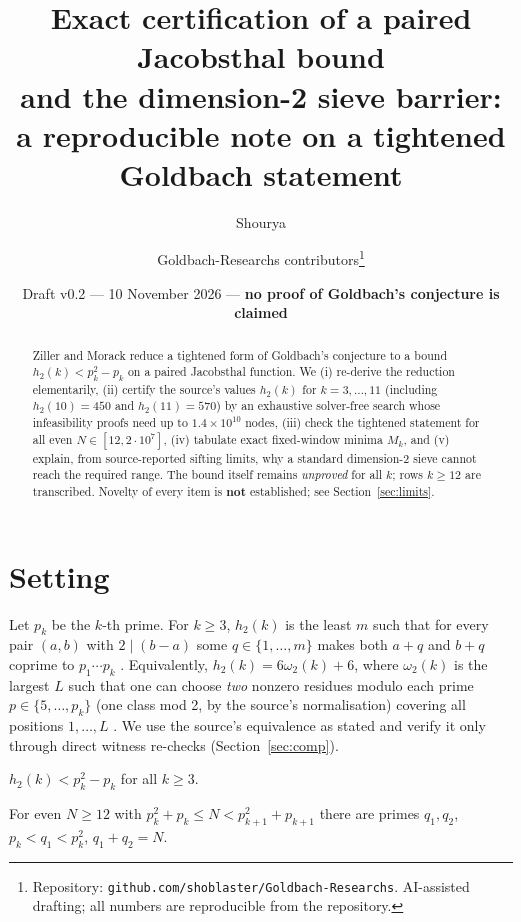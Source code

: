 \documentclass[11pt]{article}
\title{Exact certification of a paired Jacobsthal bound\\and the dimension-2 sieve barrier:\\a reproducible note on a tightened Goldbach statement}
\author{Shourya \and Goldbach-Researchs contributors\thanks{Repository: \texttt{github.com/shoblaster/Goldbach-Researchs}. AI-assisted drafting; all numbers are reproducible from the repository.}}
\date{Draft v0.2 --- 10 November 2026 --- \textbf{no proof of Goldbach's conjecture is claimed}}
\newcommand{\hh}{h_2}\newcommand{\wt}{\omega_2}
\begin{document}
\maketitle
\begin{abstract}
Ziller and Morack reduce a tightened form of Goldbach's conjecture to a bound $\hh(k)<p_k^2-p_k$ on a paired Jacobsthal function. We (i) re-derive the reduction elementarily, (ii) certify the source's values $\hh(k)$ for $k=3,\dots,11$ (including $\hh(10)=450$ and $\hh(11)=570$) by an exhaustive solver-free search whose infeasibility proofs need up to $1.4\times10^{10}$ nodes, (iii) check the tightened statement for all even $N\in[12,2\cdot10^{7}]$, (iv) tabulate exact fixed-window minima $M_k$, and (v) explain, from source-reported sifting limits, why a standard dimension-2 sieve cannot reach the required range. The bound itself remains \emph{unproved} for all $k$; rows $k\ge 12$ are transcribed. Novelty of every item is \textbf{not} established; see Section~\ref{sec:limits}.
\end{abstract}

\section{Setting}
Let $p_k$ be the $k$-th prime. For $k\ge3$, $\hh(k)$ is the least $m$ such that for every pair $(a,b)$ with $2\mid(b-a)$ some $q\in\{1,\dots,m\}$ makes both $a+q$ and $b+q$ coprime to $p_1\cdots p_k$ \cite{ZM1,ZM2}. Equivalently, $\hh(k)=6\wt(k)+6$, where $\wt(k)$ is the largest $L$ such that one can choose \emph{two} nonzero residues modulo each prime $p\in\{5,\dots,p_k\}$ (one class mod 2, by the source's normalisation) covering all positions $1,\dots,L$ \cite{ZM3}. We use the source's equivalence as stated and verify it only through direct witness re-checks (Section~\ref{sec:comp}).
\begin{conj}\label{c:H} $\hh(k)<p_k^2-p_k$ for all $k\ge3$.\end{conj}
\begin{conj}\label{c:4} For even $N\ge12$ with $p_k^2+p_k\le N<p_{k+1}^2+p_{k+1}$ there are primes $q_1,q_2$, $p_k<q_1<p_k^2$, $q_1+q_2=N$.\end{conj}
\end{document}
